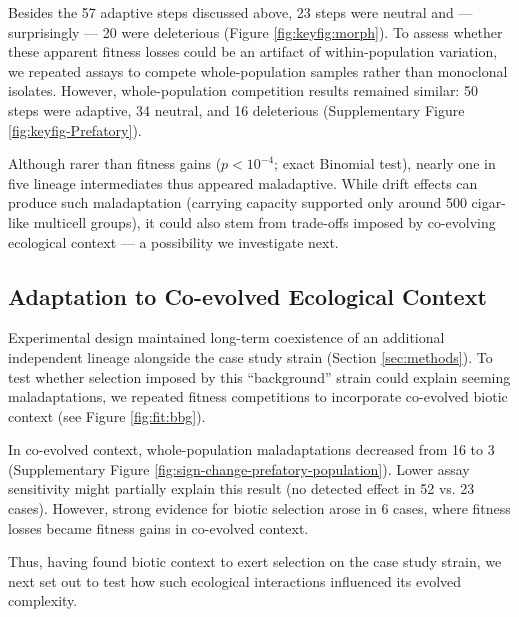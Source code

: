 Besides the 57 adaptive steps discussed above, 23 steps were neutral and --- surprisingly --- 20 were deleterious (Figure \ref{fig:keyfig:morph}).
To assess whether these apparent fitness losses could be an artifact of within-population variation, we repeated assays to compete whole-population samples rather than monoclonal isolates.
However, whole-population competition results remained similar: 50 steps were adaptive, 34 neutral, and 16 deleterious (Supplementary Figure \ref{fig:keyfig-Prefatory}).

Although rarer than fitness gains ($p < 10^{-4}$; exact Binomial test), nearly one in five lineage intermediates thus appeared maladaptive.
While drift effects can produce such maladaptation (carrying capacity supported only around 500 cigar-like multicell groups), it could also stem from trade-offs imposed by co-evolving ecological context \citep{brady2019causes} --- a possibility we investigate next.

\subsection{Adaptation to Co-evolved Ecological Context}
\label{sec:adaptation-to-coevolved-ecological-context}

Experimental design maintained long-term coexistence of an additional independent lineage alongside the case study strain (Section \ref{sec:methods}).
To test whether selection imposed by this ``background'' strain could explain seeming maladaptations, we repeated fitness competitions to incorporate co-evolved biotic context (see Figure \ref{fig:fit:bbg}).

In co-evolved context, whole-population maladaptations decreased from 16 to 3 (Supplementary Figure \ref{fig:sign-change-prefatory-population}).
Lower assay sensitivity might partially explain this result (no detected effect in 52 vs. 23 cases).
However, strong evidence for biotic selection arose in 6 cases, where fitness losses became fitness gains in co-evolved context.

Thus, having found biotic context to exert selection on the case study strain, we next set out to test how such ecological interactions influenced its evolved complexity.

